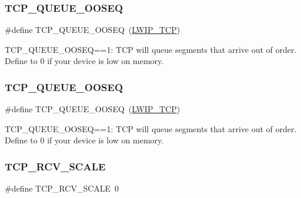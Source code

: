 \subsubsection{\texorpdfstring{T\+C\+P\+\_\+\+Q\+U\+E\+U\+E\+\_\+\+O\+O\+S\+EQ}{TCP\_QUEUE\_OOSEQ}\hspace{0.1cm}{\footnotesize\ttfamily [1/2]}}
{\footnotesize\ttfamily \#define T\+C\+P\+\_\+\+Q\+U\+E\+U\+E\+\_\+\+O\+O\+S\+EQ~(\hyperlink{group__lwip__opts__tcp_gaa4ed98deb97b77c633cb8870f34c71e9}{L\+W\+I\+P\+\_\+\+T\+CP})}

T\+C\+P\+\_\+\+Q\+U\+E\+U\+E\+\_\+\+O\+O\+S\+EQ==1\+: T\+CP will queue segments that arrive out of order. Define to 0 if your device is low on memory. \mbox{\label{group__lwip__opts__tcp_ga89ffd0d7d1529bdb26bfbad267d0ad75}} 
\subsubsection{\texorpdfstring{T\+C\+P\+\_\+\+Q\+U\+E\+U\+E\+\_\+\+O\+O\+S\+EQ}{TCP\_QUEUE\_OOSEQ}\hspace{0.1cm}{\footnotesize\ttfamily [2/2]}}
{\footnotesize\ttfamily \#define T\+C\+P\+\_\+\+Q\+U\+E\+U\+E\+\_\+\+O\+O\+S\+EQ~(\hyperlink{group__lwip__opts__tcp_gaa4ed98deb97b77c633cb8870f34c71e9}{L\+W\+I\+P\+\_\+\+T\+CP})}

T\+C\+P\+\_\+\+Q\+U\+E\+U\+E\+\_\+\+O\+O\+S\+EQ==1\+: T\+CP will queue segments that arrive out of order. Define to 0 if your device is low on memory. \mbox{\label{group__lwip__opts__tcp_ga768765a2c678fefeca6c89aae0cf629f}} 
\subsubsection{\texorpdfstring{T\+C\+P\+\_\+\+R\+C\+V\+\_\+\+S\+C\+A\+LE}{TCP\_RCV\_SCALE}\hspace{0.1cm}{\footnotesize\ttfamily [1/2]}}
{\footnotesize\ttfamily \#define T\+C\+P\+\_\+\+R\+C\+V\+\_\+\+S\+C\+A\+LE~0}

